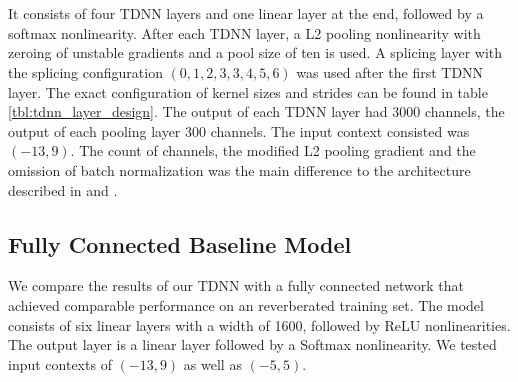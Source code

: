 \begin{minipage}{\linewidth}
	\label{fig:final_tdnn}
	\vspace{5mm}
\end{minipage}\\ \\
It consists of four TDNN layers and one linear layer at the end, followed by a softmax nonlinearity. After each TDNN layer, a L2 pooling nonlinearity with zeroing of unstable gradients and a pool size of ten is used. A splicing layer with the splicing configuration $(0, 1, 2, 3, 3, 4, 5, 6)$ was used after the first TDNN layer. The exact configuration of kernel sizes and strides can be found in table \ref{tbl:tdnn_layer_design}. The output of each TDNN layer had 3000 channels, the output of each pooling layer 300 channels. The input context consisted was $(-13, 9)$. The count of channels, the modified L2 pooling gradient and the omission of batch normalization was the main difference to the architecture described in \cite{peddinti2015reverberation} and \cite{peddinti2015jhu}. 
\subsection{Fully Connected Baseline Model}
We compare the results of our TDNN with a fully connected network that achieved comparable performance on an reverberated training set. The model consists of six linear layers with a width of 1600, followed by ReLU nonlinearities. The output layer is a linear layer followed by a Softmax nonlinearity. We tested input contexts of $(-13, 9)$ as well as $(-5, 5)$.
